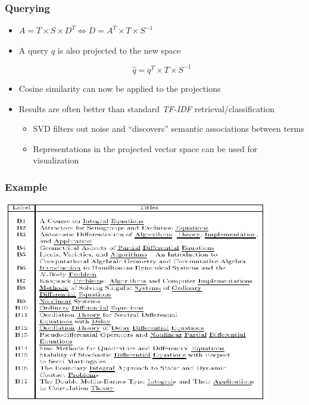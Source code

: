 \documentclass{beamer}
\begin{document}
\begin{frame}
  \frametitle{Querying}

  \begin{itemize}
  \item $A = T \times S \times D^T \Leftrightarrow D = A^T \times T \times S^{-1}$
  \item A query $q$ is also projected to the new space
    \begin{block}{}
      \begin{displaymath}
        \hat{q} = q^T \times T \times S^{-1}
      \end{displaymath}
    \end{block}
  \item Cosine similarity can now be applied to the projections
  \item Results are often better than standard \textit{TF-IDF} retrieval/classification
    \begin{itemize}
    \item SVD filters out noise and ``discovers'' semantic associations between terms
    \item Representations in the projected vector space can be used for visualization
    \end{itemize}
  \end{itemize}

\end{frame}


\begin{frame}
  \frametitle{Example}

  \centering
  \includegraphics[width=\linewidth]{lsi1}

\end{frame}
\end{document}
